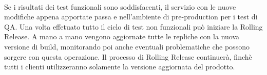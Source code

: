 \paragraph{}
Se i risultati dei test funzionali sono soddisfacenti, il servizio con le nuove modifiche appena apportate passa e nell'ambiente di pre-production per i test di QA. Una volta effetuato tutto il ciclo di test non funzionali può iniziare la Rolling Release. A mano a mano vengono aggiornate tutte le repliche con la nuova versione di build, monitorando poi anche eventuali problematiche che possono sorgere con questa operazione. Il processo di Rolling Release continuerà,  finchè tutti i clienti utilizzeranno solamente la versione aggiornata del prodotto.


